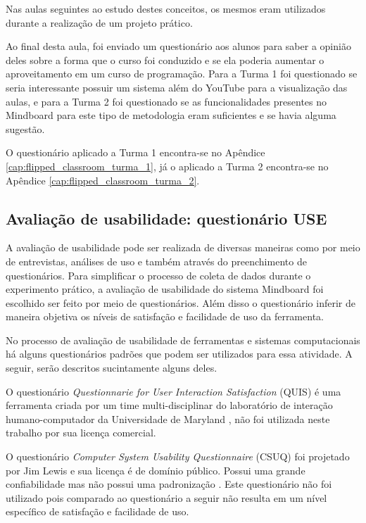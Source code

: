 Nas aulas seguintes ao estudo destes conceitos, os mesmos eram utilizados durante a realização de um projeto prático.

Ao final desta aula, foi enviado um questionário aos alunos para saber a opinião deles sobre a forma que o curso foi conduzido e se ela poderia aumentar o aproveitamento em um curso de programação. Para a Turma 1 foi questionado se seria interessante possuir um sistema além do YouTube para a visualização das aulas, e para a Turma 2 foi questionado se as funcionalidades presentes no Mindboard para este tipo de metodologia eram suficientes e se havia alguma sugestão.

O questionário aplicado a Turma 1 encontra-se no Apêndice \ref{cap:flipped_classroom_turma_1}, já o aplicado a Turma 2 encontra-se no Apêndice \ref{cap:flipped_classroom_turma_2}.

\subsection{Avaliação de usabilidade: questionário USE}
\label{sec:use}

A avaliação de usabilidade pode ser realizada de diversas maneiras como por meio de entrevistas, análises de uso e também através do preenchimento de questionários. Para simplificar o processo de coleta de dados durante o experimento prático, a avaliação de usabilidade do sistema Mindboard foi escolhido ser feito por meio de questionários. Além disso o questionário inferir de maneira objetiva os níveis de satisfação e facilidade de uso da ferramenta.

No processo de avaliação de usabilidade de ferramentas e sistemas computacionais há alguns questionários padrões que podem ser utilizados para essa atividade. A seguir, serão descritos sucintamente alguns deles. 

O questionário \emph{Questionnarie for User Interaction Satisfaction} (QUIS) é uma ferramenta criada por um time multi-disciplinar do laboratório de interação humano-computador da Universidade de Maryland \cite{quis}, não foi utilizada neste trabalho por sua licença comercial.

O questionário \emph{Computer System Usability Questionnaire} (CSUQ) foi projetado por Jim Lewis e sua licença é de domínio público. Possui uma grande confiabilidade mas não possui uma padronização \cite{csuq}. Este questionário não foi utilizado pois comparado ao questionário a seguir não resulta em um nível específico de satisfação e facilidade de uso.

